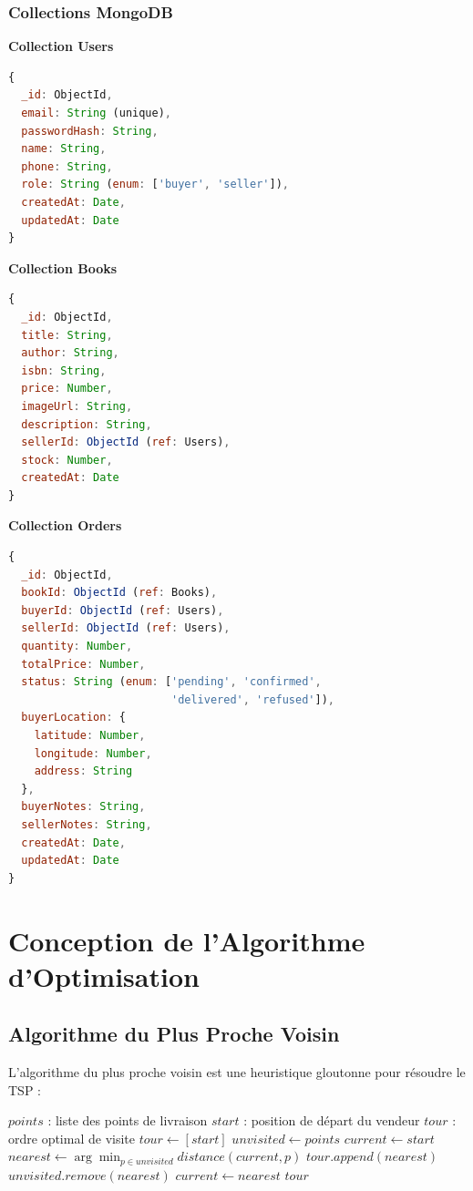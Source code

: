 \documentclass[12pt,a4paper]{report}
\begin{document}
\subsubsection{Collections MongoDB}

\textbf{Collection Users}
\begin{lstlisting}[language=JavaScript, caption=Schéma User]
{
  _id: ObjectId,
  email: String (unique),
  passwordHash: String,
  name: String,
  phone: String,
  role: String (enum: ['buyer', 'seller']),
  createdAt: Date,
  updatedAt: Date
}
\end{lstlisting}

\textbf{Collection Books}
\begin{lstlisting}[language=JavaScript, caption=Schéma Book]
{
  _id: ObjectId,
  title: String,
  author: String,
  isbn: String,
  price: Number,
  imageUrl: String,
  description: String,
  sellerId: ObjectId (ref: Users),
  stock: Number,
  createdAt: Date
}
\end{lstlisting}

\textbf{Collection Orders}
\begin{lstlisting}[language=JavaScript, caption=Schéma Order]
{
  _id: ObjectId,
  bookId: ObjectId (ref: Books),
  buyerId: ObjectId (ref: Users),
  sellerId: ObjectId (ref: Users),
  quantity: Number,
  totalPrice: Number,
  status: String (enum: ['pending', 'confirmed',
                         'delivered', 'refused']),
  buyerLocation: {
    latitude: Number,
    longitude: Number,
    address: String
  },
  buyerNotes: String,
  sellerNotes: String,
  createdAt: Date,
  updatedAt: Date
}
\end{lstlisting}

\section{Conception de l'Algorithme d'Optimisation}

\subsection{Algorithme du Plus Proche Voisin}

L'algorithme du plus proche voisin est une heuristique gloutonne pour résoudre le TSP :

\begin{algorithm}[H]
\caption{Plus Proche Voisin pour TSP}
\begin{algorithmic}[1]
\Require $points$ : liste des points de livraison
\Require $start$ : position de départ du vendeur
\Ensure $tour$ : ordre optimal de visite
\State $tour \gets [start]$
\State $unvisited \gets points$
\State $current \gets start$
    \State $nearest \gets \arg\min_{p \in unvisited} distance(current, p)$
    \State $tour.append(nearest)$
    \State $unvisited.remove(nearest)$
    \State $current \gets nearest$
\EndWhile
\State \Return $tour$
\end{algorithmic}
\end{algorithm}
\end{document}
